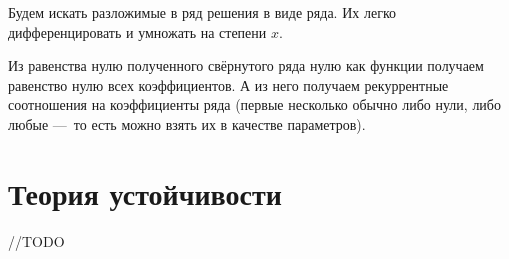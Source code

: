 \documentclass[12pt, a4paper]{article}
\begin{document}
Будем искать разложимые в ряд решения в виде ряда.
Их легко дифференцировать и умножать на степени $x$.

Из равенства нулю полученного свёрнутого ряда нулю как функции 
получаем равенство нулю всех коэффициентов. 
А из него получаем рекуррентные соотношения на коэффициенты ряда 
(первые несколько обычно либо нули, 
либо любые — то есть можно взять их в качестве параметров).

\section{Теория устойчивости}

//TODO
\end{document}

